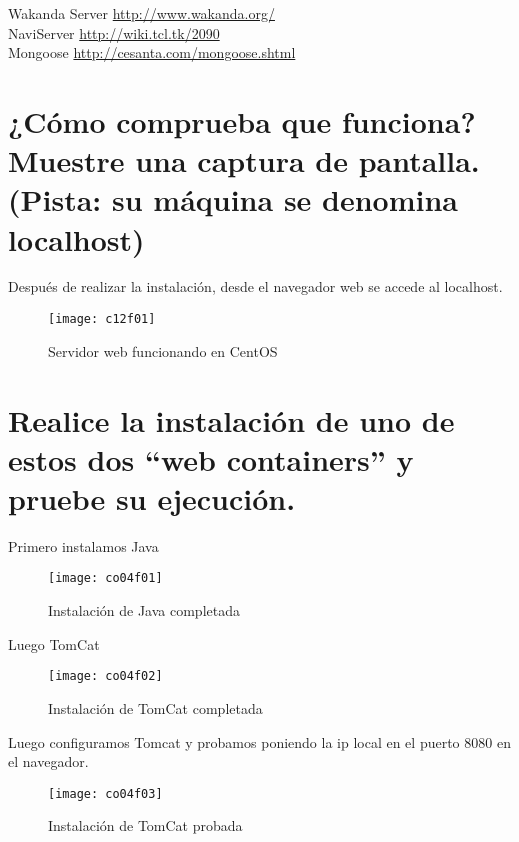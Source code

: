Wakanda Server \url{http://www.wakanda.org/}\\
NaviServer \url{http://wiki.tcl.tk/2090}\\
Mongoose \url{http://cesanta.com/mongoose.shtml}


\section{¿Cómo comprueba que funciona? Muestre una captura de pantalla. (Pista: su máquina se denomina localhost)}

Después de realizar la instalación, desde el navegador web se accede al localhost.

\begin{figure}[H]
	\centering
	\texttt{[image: c12f01]}
	\caption{Servidor web funcionando en CentOS}
	\label{fig:c12f01}
\end{figure}



\section{Realice la instalación de uno de estos dos “web containers” y pruebe su ejecución.}

Primero instalamos Java
\begin{figure}[H]
	\centering
	\texttt{[image: co04f01]}
	\caption{Instalación de Java completada}
	\label{fig:co04f01}
\end{figure}
Luego TomCat 
\begin{figure}[H]
	\centering
	\texttt{[image: co04f02]}
	\caption{Instalación de TomCat completada}
	\label{fig:co04f02}
\end{figure}

Luego configuramos Tomcat \cite{11co01} y probamos poniendo la ip local en el puerto 8080 en el navegador.
\begin{figure}[H]
	\centering
	\texttt{[image: co04f03]}
	\caption{Instalación de TomCat probada}
	\label{fig:co04f03}
\end{figure}


